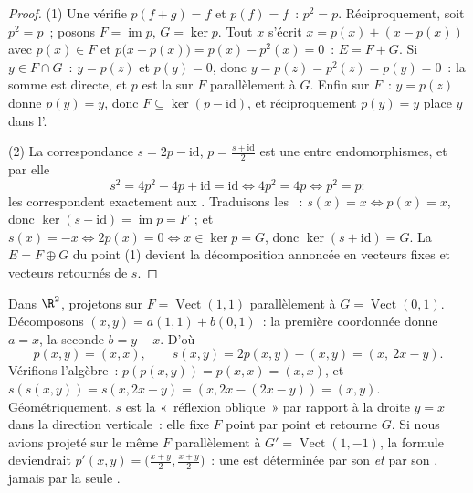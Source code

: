 \begin{proof}
(1) Une  vérifie $p(f + g) = f$ et $p(f) = f$~: $p^2 = p$.
Réciproquement, soit $p^2 = p$~; posons $F = \operatorname{im} p$, $G = \ker
p$. Tout $x$ s'écrit $x = p(x) + (x - p(x))$ avec $p(x) \in F$ et
$p\bigl(x - p(x)\bigr) = p(x) - p^2(x) = 0$~: $E = F + G$. Si $y \in
F \cap G$~: $y = p(z)$ et $p(y) = 0$, donc $y = p(z) = p^2(z) = p(y) =
0$~: la somme est directe, et $p$ est la  sur $F$ parallèlement à $G$.
Enfin sur $F$~: $y = p(z)$ donne $p(y) = y$, donc $F \subseteq
\ker(p - \mathrm{id})$, et réciproquement $p(y) = y$ place $y$ dans
l'.

(2) La correspondance $s = 2p - \mathrm{id}$, $p = \frac{s +
\mathrm{id}}2$ est une  entre endomorphismes, et par elle
\[
s^2 = 4p^2 - 4p + \mathrm{id} = \mathrm{id}
\iff 4p^2 = 4p \iff p^2 = p :
\]
les  correspondent exactement aux . Traduisons les
~: $s(x) = x \iff p(x) = x$, donc $\ker(s - \mathrm{id}) =
\operatorname{im} p = F$~; et $s(x) = -x \iff 2p(x) = 0 \iff x
\in \ker p = G$, donc $\ker(s + \mathrm{id}) = G$. La 
$E = F \oplus G$ du point (1) devient la décomposition annoncée
en vecteurs fixes et vecteurs retournés de $s$.
\end{proof}

\begin{example}
\label{ex:b1:linmaps:projexplicit}
Dans $\R^2$, projetons sur $F = \operatorname{Vect}(1,1)$ parallèlement à $G =
\operatorname{Vect}(0,1)$. Décomposons $(x, y) = a(1,1) + b(0,1)$~:
la première coordonnée donne $a = x$, la seconde $b = y - x$.
D'où
\[
p(x, y) = (x, x),
\qquad
s(x, y) = 2p(x,y) - (x,y) = (x,\ 2x - y).
\]
Vérifions l'algèbre~: $p(p(x,y)) = p(x,x) = (x,x)$, et $s(s(x,y)) =
s(x, 2x - y) = (x, 2x - (2x - y)) = (x, y)$. Géométriquement, $s$
est la «~réflexion oblique~» par rapport à la droite $y = x$ dans la
direction verticale~: elle fixe $F$ point par point et retourne $G$. Si
nous avions projeté sur le même $F$ parallèlement à $G' =
\operatorname{Vect}(1,-1)$, la formule deviendrait
$p'(x,y) = \bigl(\frac{x+y}2, \frac{x+y}2\bigr)$~: une  est
déterminée par son  \emph{et} par son , jamais par la seule
.
\end{example}

